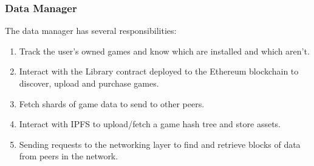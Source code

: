 \subsubsection*{Data Manager}

The data manager has several responsibilities:

\begin{enumerate}
  \item Track the user's owned games and know which are installed and which aren't.
  \item Interact with the Library contract deployed to the Ethereum blockchain to discover, upload and purchase games.
  \item Fetch shards of game data to send to other peers.
  \item Interact with IPFS to upload/fetch a game hash tree and store assets.
  \item Sending requests to the networking layer to find and retrieve blocks of data from peers in the network.
\end{enumerate}